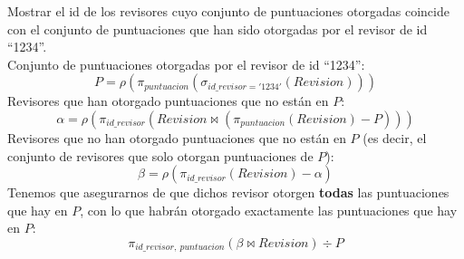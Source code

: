\documentclass[12pt]{article}
\begin{document}
    \begin{ejercicio}
        Mostrar el id de los revisores cuyo conjunto de puntuaciones otorgadas coincide con el conjunto de puntuaciones que han sido otorgadas por el revisor de id ``1234''.\\

        \noindent
        Conjunto de puntuaciones otorgadas por el revisor de id ``1234'':
        \begin{equation*}
            P = \rho(\pi_{puntuacion}(\sigma_{id\_revisor='1234'}(Revision)))
        \end{equation*}
        Revisores que han otorgado puntuaciones que no están en $P$:
        \begin{equation*}
            \alpha = \rho (\pi_{id\_revisor}(Revision \bowtie (\pi_{puntuacion}(Revision) - P)))
        \end{equation*}
        Revisores que no han otorgado puntuaciones que no están en $P$ (es decir, el conjunto de revisores que solo otorgan puntuaciones de $P$):
        \begin{equation*}
            \beta = \rho(\pi_{id\_revisor}(Revision) - \alpha)
        \end{equation*}
        Tenemos que asegurarnos de que dichos revisor otorgen \textbf{todas} las puntuaciones que hay en $P$, con lo que habrán otorgado exactamente las puntuaciones que hay en $P$:
        \begin{equation*}
            \pi_{id\_revisor,\ puntuacion}(\beta \bowtie Revision) \div P
        \end{equation*}
    \end{ejercicio}
\end{document}
